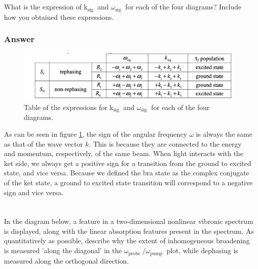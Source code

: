 \documentclass[12pt]{article}
\begin{document}
\subsection{}
What is the expression of $\mathrm{k}_{\text {sig }}$ and $\omega_{\text {sig }}$ for each of the four diagrams? Include how you obtained these expressions.
\subsubsection{Answer}
\begin{figure}[h]
\includegraphics[max width=\textwidth, center]{table.png}
\caption{Table of the expressions for $\mathrm{k}_{\text {sig }}$ and $\omega_{\text {sig }}$ for each of the four diagrams.}
\label{fig:table}
\end{figure}
As can be seen in figure \ref{fig:table}, the sign of the angular frequency $\omega$ is always the same as that of the wave vector $k$. This is because they are connected to the energy and momentum, respectively, of the same beam. When light interacts with the ket side, we always get a positive sign for a transition from the ground to excited state, and vice versa. Because we defined the bra state as the complex conjugate of the ket state, a ground to excited state transition will correspond to a negative sign and vice versa.
\section{}
In the diagram below, a feature in a two-dimensional nonlinear vibronic spectrum is displayed, along with the linear absorption features present in the spectrum. As quantitatively as possible, describe why the extent of inhomogeneous broadening is measured 'along the diagonal' in the $\omega_{\text {probe }} / \omega_{\text {pump }}$ plot, while dephasing is measured along the orthogonal direction.
\end{document}
